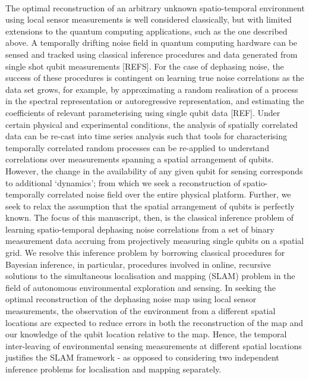 \\
The optimal reconstruction of an arbitrary unknown spatio-temporal environment using local sensor measurements is well considered classically, but with limited extensions to the quantum computing applications, such as the one described above. A temporally drifting noise field in quantum computing hardware can be sensed and tracked using classical inference procedures and data generated from single shot qubit measurements [REFS]. For the case of dephasing noise, the success of these procedures is contingent on learning true noise correlations as the data set grows, for example, by approximating a random realisation of a process in the spectral representation or autoregressive representation, and estimating the coefficients of relevant parameterising using single qubit data [REF]. Under certain physical and experimental conditions, the analysis of spatially correlated data can be re-cast into time series analysis such that tools for characterising temporally correlated random processes can be re-applied to understand correlations over measurements spanning a spatial arrangement of qubits. However, the  change in the availability of any given qubit for sensing corresponds to additional `dynamics'; from which we seek a reconstruction of spatio-temporally correlated noise field over the entire physical platform. Further, we seek to relax the assumption that the spatial arrangement of qubits is perfectly known. The focus of this manuscript, then, is the classical inference problem of learning spatio-temporal dephasing noise correlations from a set of binary measurement data accruing from projectively measuring single qubits on a spatial grid. We resolve this inference problem by borrowing classical procedures for Bayesian inference, in particular, procedures involved in  online, recursive solutions to the simultaneous localisation and mapping (SLAM) problem in the field of autonomous environmental exploration and sensing. In seeking the optimal reconstruction of the dephasing noise map using local sensor measurements, the observation of the environment from a different spatial locations are expected to reduce errors in both the reconstruction of the map and our knowledge of the qubit location relative to the map. Hence, the temporal inter-leaving of environmental sensing measurements at different spatial locations justifies the SLAM framework - as opposed to considering two independent inference problems for localisation and mapping separately.\\
\\
